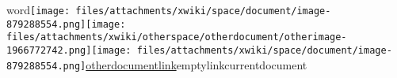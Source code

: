 \documentclass{article}
\begin{document}
word\texttt{[image: files/attachments/xwiki/space/document/image-879288554.png]}\texttt{[image: files/attachments/xwiki/otherspace/otherdocument/otherimage-1966772742.png]}\texttt{[image: files/attachments/xwiki/space/document/image-879288554.png]}\href{http://test/bin/view/OtherSpace/OtherDocument}{otherdocumentlink}emptylinkcurrentdocument
\end{document}
